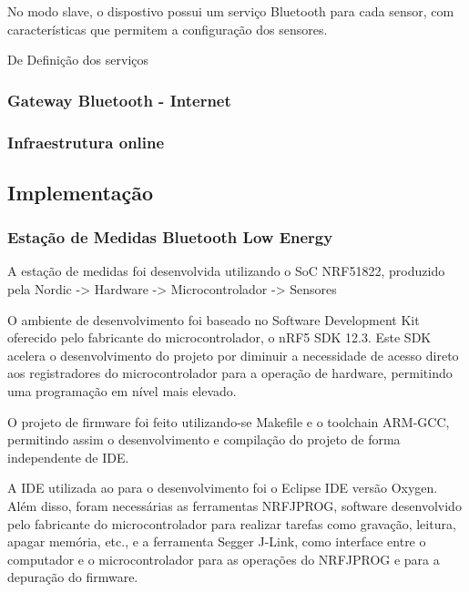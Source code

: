 No modo slave, o dispostivo possui um serviço Bluetooth para cada sensor, com características que permitem a configuração dos sensores. 

De
Definição dos serviços



\subsubsection{Gateway Bluetooth - Internet}




\subsubsection{Infraestrutura online}


\subsection{Implementação}

\subsubsection{Estação de Medidas Bluetooth Low Energy}

A estação de medidas foi desenvolvida utilizando o SoC NRF51822, produzido pela Nordic
-> Hardware
-> Microcontrolador
-> Sensores		

O ambiente de desenvolvimento foi baseado no Software Development Kit oferecido
pelo fabricante do microcontrolador, o nRF5 SDK 12.3. Este SDK acelera o
desenvolvimento do projeto por diminuir a necessidade de acesso direto aos
registradores do microcontrolador para a operação de hardware, permitindo uma
programação em nível mais elevado.
 
O projeto de firmware foi feito utilizando-se Makefile e o toolchain ARM-GCC,
permitindo assim o desenvolvimento e compilação do projeto de forma
independente de IDE.

A IDE utilizada ao para o desenvolvimento foi o Eclipse IDE versão Oxygen. Além
disso, foram necessárias as ferramentas NRFJPROG, software desenvolvido pelo
fabricante do microcontrolador para realizar tarefas como gravação, leitura,
apagar memória, etc., e a ferramenta Segger J-Link, como interface entre o
computador e o microcontrolador para as operações do NRFJPROG e para a
depuração do firmware.
 
